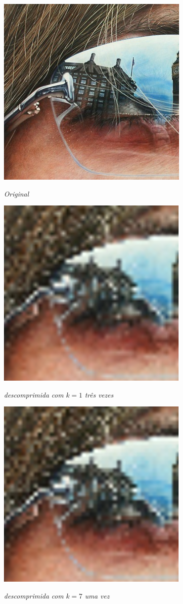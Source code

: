\documentclass{article}
\begin{document}
\bigskip
\begin{center}

\includegraphics[scale=.8415]{real.png}

\emph{Original}

\bigskip
\includegraphics[scale=.63]{real1k_3vezes.png}

\emph{descomprimida com $k = 1$ três vezes}

\bigskip
\includegraphics[scale=.63]{real7k.png}

\emph{descomprimida com $k = 7$ uma vez}

\end{center}
\end{document}
